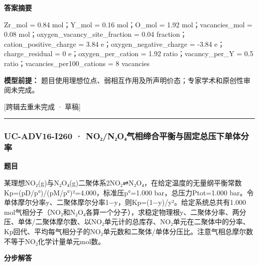 \documentclass[UTF8,11pt,a4paper]{ctexart}
\begin{document}
\noindent\textbf{答案摘要}\par
Zr\_mol = 0.84 mol；Y\_mol = 0.16 mol；O\_mol = 1.92 mol；vacancies\_mol = 0.08 mol；oxygen\_vacancy\_site\_fraction = 0.04 fraction；cation\_positive\_charge = 3.84 e；oxygen\_negative\_charge = -3.84 e；charge\_residual = 0 e；oxygen\_per\_cation = 1.92 ratio；vacancy\_per\_Y = 0.5 ratio；vacancies\_per100\_cations = 8 vacancies\par
\noindent\textbf{模型前提：}
题目使用理想位点、弱相互作用及所声明价态；专家学术和原创性审阅未完成。\par
\noindent\textcolor{red!65!black}{[跨辑去重未完成 · 草稿]} \par
\medskip\hrule\medskip
{}
\subsubsection*{UC-ADV16-I260 · NO₂/N₂O₄气相缔合平衡与固定总压下单体分率}
\noindent\textbf{题目}\par
某理想NO₂(g)与N₂O₄(g)二聚体系2NO₂⇌N₂O₄，在给定温度的无量纲平衡常数Kp=(pD/p°)/(pM/p°)²=4.000，标准压p°=1.000 bar，总压力Ptot=1.000 bar。令单体摩尔分率y、二聚体摩尔分率1−y，则Kp=(1−y)/y²。给定系统总共有1.000 mol气相分子（NO₂和N₂O₄各算一个分子），求稳定物理根y、二聚体分率、两分压、单体/二聚体摩尔数、以NO₂单元计的总库存、NO₂单元在二聚体中的分率、Kp回代、平均每气相分子的NO₂单元数和二聚体/单体分压比。注意气相总摩尔数不等于NO₂化学计量单元mol数。\par
\medskip\noindent\textbf{分步解答}
\end{document}
